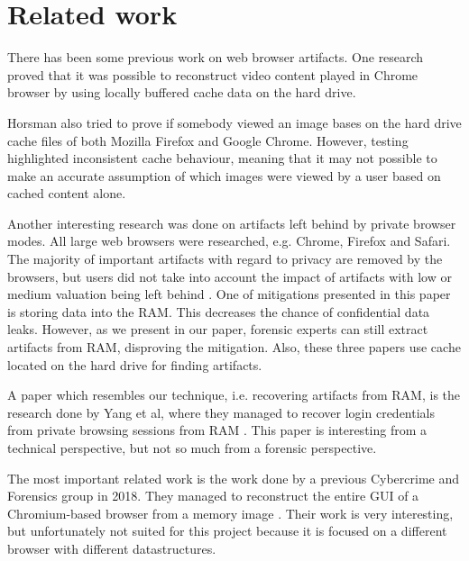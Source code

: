 \section{Related work}
\label{sec:related_work}

There has been some previous work on web browser artifacts. One
research proved that it was possible to reconstruct video content
played in Chrome browser by using locally buffered cache data on
the hard drive. \cite{horsman2018reconstructing}

Horsman also tried to prove if somebody viewed an image bases on the
hard drive cache files of both Mozilla Firefox and Google
Chrome. However, testing highlighted inconsistent cache behaviour,
meaning that it may not possible to make an accurate assumption of
which images were viewed by a user based on cached content alone.
\cite{horsman2018didn}

Another interesting research was done on artifacts left behind by
private browser modes. All large web browsers were researched,
e.g. Chrome, Firefox and Safari. The majority of important artifacts
with regard to privacy are removed by the browsers, but users did not
take into account the impact of artifacts with low or medium valuation
being left behind \cite{tsalis2017exploring}. One of mitigations
presented in this paper is storing data into the RAM. This decreases
the chance of confidential data leaks. However, as we present in our
paper, forensic experts can still extract artifacts from RAM,
disproving the mitigation. Also, these three papers use cache located
on the hard drive for finding artifacts.

A paper which resembles our technique, i.e. recovering artifacts from
RAM, is the research done by Yang et al, where they managed to recover
login credentials from private browsing sessions from RAM
\cite{yang2017applying}. This paper is interesting from a technical
perspective, but not so much from a forensic perspective.

The most important related work is the work done by a previous
Cybercrime and Forensics group in 2018. They managed to reconstruct
the entire GUI of a Chromium-based browser from a memory image
\cite{wikner2018reconstruct}. Their work is very interesting, but
unfortunately not suited for this project because it is focused on a
different browser with different datastructures.
